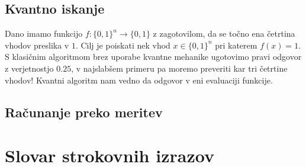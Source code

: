 \documentclass[mat1]{fmfdelo}
\begin{document}
\subsection{Kvantno iskanje}
Dano imamo funkcijo \(f: \{0,1\}^n\to \{0,1\}\) z zagotovilom, da se točno ena četrtina vhodov preslika v \(1\). Cilj je poiskati nek vhod \(x\in\{0,1\}^n\) pri katerem \(f(x) = 1\). S klasičnim algoritmom brez uporabe kvantne mehanike ugotovimo pravi odgovor z verjetnostjo \(0.25\), v najslabšem primeru pa moremo preveriti kar tri četrtine vhodov! Kvantni algoritm nam vedno da odgovor v eni evaluaciji funkcije.
\subsection{Računanje preko meritev}


\section*{Slovar strokovnih izrazov}



\printbibliography
\end{document}
